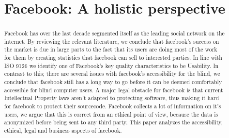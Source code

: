 \documentclass[conference]{IEEEtran}
\begin{document}
\title{Facebook: A holistic perspective}


\author{
\and

\and

\and

}


\maketitle


\begin{abstract}
Facebook has over the last decade segmented itself as the leading social
network on the internet. By reviewing the relevant literature, we conclude that
facebook's success on the market is due in large parts to the fact that its
users are doing most of the work for them by creating statistics that facebook
can sell to interested parties. In line with ISO 9126 we identify one of
Facebook's key quality characteristics to be Usability. In contrast to this;
there are several issues with facebook's accessibility for the blind, we
conclude that facebook still has a long way to go before it can be deemed
comfortably accessible for blind computer users. A major legal obstacle for
facebook is that current Intellectual Property laws aren't adapted to
protecting software, thus making it hard for facebook to protect their
sourcecode.  Facebook collects a lot of information on it's users, we argue
that this is correct from an ethical point of view, because the data is
anonymized before being sent to any third party. This paper analyzes the
accessibility, ethical, legal and business aspects of facebook. 
\end{abstract}
\end{document}

